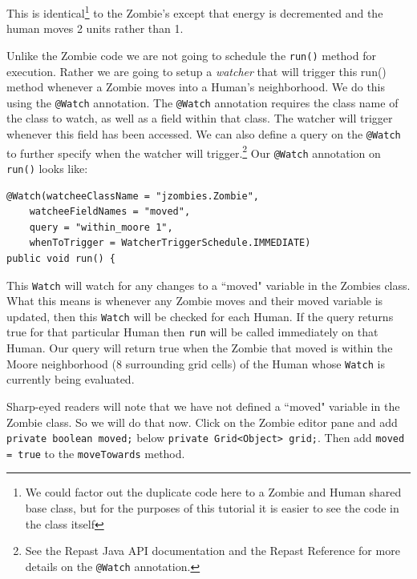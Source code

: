 \documentclass[11pt]{amsart}
\begin{document}
This is identical\footnote{We could factor out the duplicate code here to a Zombie and Human shared base class, but for the purposes of this tutorial it is easier to see the code in the class itself} to the Zombie's except that energy is decremented and the human moves 2 units rather than 1.

Unlike the Zombie code we are not going to schedule the \texttt{run()} method for execution. Rather we are going to setup a \textit{watcher} that will trigger this run() method whenever a Zombie moves into a Human's neighborhood. We do this using the \texttt{@Watch} annotation. The \texttt{@Watch} annotation requires the class name of the class to watch, as well as a field within that class. The watcher will trigger whenever this field has been accessed. We can also define a query on the \texttt{@Watch} to further specify when the watcher will trigger.\footnote{See the Repast Java API documentation and the Repast Reference for more details on the \texttt{@Watch} annotation.}  Our \texttt{@Watch} annotation on \texttt{run()} looks like:

\noindent\begin{minipage}[h]{\textwidth}
\vspace{.2in}
\lstset{language=java,caption=Run with Watcher}
\begin{lstlisting}
@Watch(watcheeClassName = "jzombies.Zombie", 
	watcheeFieldNames = "moved", 
	query = "within_moore 1", 
	whenToTrigger = WatcherTriggerSchedule.IMMEDIATE)
public void run() {
\end{lstlisting}
\vspace{.2in}
\end{minipage}

This \texttt{Watch} will watch for any changes to a ``moved" variable in the Zombies class. What this means is whenever any Zombie moves and their moved variable is updated, then this \texttt{Watch} will be checked for each Human. If the query returns true for that particular Human then \texttt{run} will be called immediately on that Human. Our query will return true when the Zombie that moved is within the Moore neighborhood (8 surrounding grid cells) of the Human whose \texttt{Watch} is currently being evaluated.

Sharp-eyed readers will note that we have not defined a ``moved" variable in the Zombie class. So we will do that now. Click on the Zombie editor pane and add \texttt{private boolean moved;} below \texttt{private Grid<Object> grid;}. Then add \texttt{moved = true} to the \texttt{moveTowards} method.
\end{document}
